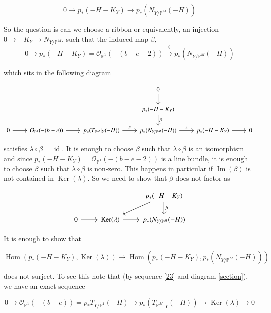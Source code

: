 \documentclass[11pt,twoside]{amsart}
\theoremstyle{plain}
\numberwithin{equation}{section}
\theoremstyle{definition}
\begin{document}
$$0 \to p_*(-H-K_Y) \to p_*(N_{Y/\mathbb{P}^M}(-H))$$

So the question is can we choose a ribbon or equivalently, an injection $0 \to -K_Y \to N_{Y/\mathbb{P}^M}$, such that the induced map $\beta$,  $$0 \to p_*(-H-K_Y) = \mathcal{O}_{\mathbb{P}^1}(-(b-e-2)) \xrightarrow[]{\beta} p_*(N_{Y/\mathbb{P}^M}(-H))$$

which sits in the following diagram 

\begin{equation}\label{section}
\begin{tikzcd}
  &&& 0 \arrow[d] && \\
  &&& p_*(-H-K_Y) \arrow[d, "\beta"] && \\
  0 \arrow[r] & \mathcal{O}_{\mathbb{P}^1}(-(b-e)) \arrow[r] &  p_*(T_{\mathbb{P}^M}|_Y(-H)) \arrow[r, "\delta"] & p_*(N_{Y/\mathbb{P}^M}(-H)) \arrow[r, "\lambda"] & p_*(-H-K_Y) \arrow[r] & 0  
\end{tikzcd}
\end{equation}
\smallskip 

satisfies $\lambda \circ \beta = \operatorname{id}$. It is enough to choose $\beta$ such that $\lambda \circ \beta$  is an isomorphism and since $p_*(-H-K_Y) = \mathcal{O}_{\mathbb{P}^1}(-(b-e-2))$ is a line bundle, it is enough to choose $\beta$ such that $\lambda \circ \beta$ is non-zero. This happens in particular if $\operatorname{Im}(\beta)$ is not contained in $\operatorname{Ker}(\lambda)$. So we need to show that $\beta$ does not factor as 

\[
\begin{tikzcd}
   & & p_*(-H-K_Y) \arrow[d, "\beta"] \arrow[dl] \\
   0 \arrow[r] & \operatorname{Ker}(\lambda) \arrow[r] & p_*(N_{Y/\mathbb{P}^M}(-H))
\end{tikzcd}
\]

It is enough to show that 

\begin{equation}\label{32}
    \operatorname{Hom}(p_*(-H-K_Y), \operatorname{Ker}(\lambda)) \to \operatorname{Hom}(p_*(-H-K_Y), p_*(N_{Y/\mathbb{P}^M}(-H))) 
\end{equation}


does not surject. To see this note that (by sequence \ref{23} and diagram \ref{section}),  we have an exact sequence

$$0 \to \mathcal{O}_{\mathbb{P}^1}(-(b-e)) = p_*T_{Y/\mathbb{P}^1}(-H) \to p_*(T_{\mathbb{P}^M}|_Y(-H)) \to \operatorname{Ker}(\lambda) \to 0$$
\end{document}
